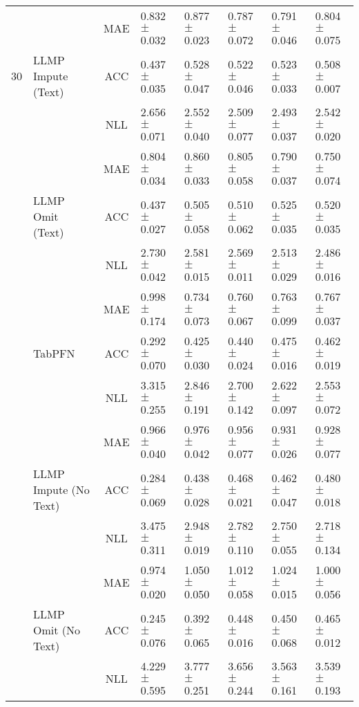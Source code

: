 \begin{table*}[htbp]
\begin{tiny}
\begin{sc}
\begin{adjustbox}{max width=\textwidth}
\begin{tabular}{crclllll}
\cmidrule{2-8}          &       & MAE   & 0.832$\pm$0.032 & 0.877$\pm$0.023 & 0.787$\pm$0.072 & 0.791$\pm$0.046 & 0.804$\pm$0.075 \\
    30    & \multicolumn{1}{l}{LLMP Impute (Text)} & ACC   & 0.437$\pm$0.035 & 0.528$\pm$0.047 & 0.522$\pm$0.046 & 0.523$\pm$0.033 & 0.508$\pm$0.007 \\
          &       & NLL   & 2.656$\pm$0.071 & 2.552$\pm$0.040 & 2.509$\pm$0.077 & 2.493$\pm$0.037 & 2.542$\pm$0.020 \\
\cmidrule{2-8}          &       & MAE   & 0.804$\pm$0.034 & 0.860$\pm$0.033 & 0.805$\pm$0.058 & 0.790$\pm$0.037 & 0.750$\pm$0.074 \\
          & \multicolumn{1}{l}{LLMP Omit (Text)} & ACC   & 0.437$\pm$0.027 & 0.505$\pm$0.058 & 0.510$\pm$0.062 & 0.525$\pm$0.035 & 0.520$\pm$0.035 \\
          &       & NLL   & 2.730$\pm$0.042 & 2.581$\pm$0.015 & 2.569$\pm$0.011 & 2.513$\pm$0.029 & 2.486$\pm$0.016 \\
\cmidrule{2-8}          &       & MAE   & 0.998$\pm$0.174 & 0.734$\pm$0.073 & 0.760$\pm$0.067 & 0.763$\pm$0.099 & 0.767$\pm$0.037 \\
          & \multicolumn{1}{l}{TabPFN} & ACC   & 0.292$\pm$0.070 & 0.425$\pm$0.030 & 0.440$\pm$0.024 & 0.475$\pm$0.016 & 0.462$\pm$0.019 \\
          &       & NLL   & 3.315$\pm$0.255 & 2.846$\pm$0.191 & 2.700$\pm$0.142 & 2.622$\pm$0.097 & 2.553$\pm$0.072 \\
    \midrule
          &       & MAE   & 0.966$\pm$0.040 & 0.976$\pm$0.042 & 0.956$\pm$0.077 & 0.931$\pm$0.026 & 0.928$\pm$0.077 \\
          & \multicolumn{1}{l}{LLMP Impute (No Text)} & ACC   & 0.284$\pm$0.069 & 0.438$\pm$0.028 & 0.468$\pm$0.021 & 0.462$\pm$0.047 & 0.480$\pm$0.018 \\
          &       & NLL   & 3.475$\pm$0.311 & 2.948$\pm$0.019 & 2.782$\pm$0.110 & 2.750$\pm$0.055 & 2.718$\pm$0.134 \\
\cmidrule{2-8}          &       & MAE   & 0.974$\pm$0.020 & 1.050$\pm$0.050 & 1.012$\pm$0.058 & 1.024$\pm$0.015 & 1.000$\pm$0.056 \\
          & \multicolumn{1}{l}{LLMP Omit (No Text)} & ACC   & 0.245$\pm$0.076 & 0.392$\pm$0.065 & 0.448$\pm$0.016 & 0.450$\pm$0.068 & 0.465$\pm$0.012 \\
          &       & NLL   & 4.229$\pm$0.595 & 3.777$\pm$0.251 & 3.656$\pm$0.244 & 3.563$\pm$0.161 & 3.539$\pm$0.193 \\

\end{tabular}
\end{adjustbox}
\end{sc}
\end{tiny}
\end{table*}
